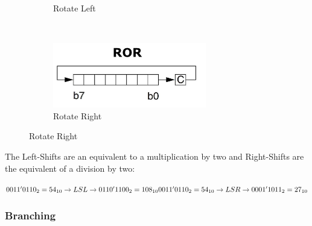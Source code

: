 \documentclass[a4paper, 11pt, nofootinbib]{book}
\begin{document}
\begin{figure}[htb]
\begin{subfigure}[b]{0.5\textwidth}
		\caption{Rotate Left}
	\end{subfigure}%
	~ 
	\begin{subfigure}[b]{0.5\textwidth}
		\centering
		\includegraphics[keepaspectratio=true, height=7.5\baselineskip]{ROR.PNG}
		\caption{Rotate Right}
	\end{subfigure}
\end{figure}

\noindent The Left-Shifts are an equivalent to a multiplication by two and Right-Shifts are the equivalent of a division by two:

\noindent 
$
0011'0110_{2} = 54_{10} \rightarrow LSL \rightarrow 0110'1100_{2} = 108_{10} \\
0011'0110_{2} = 54_{10} \rightarrow LSR \rightarrow 0001'1011_{2} = 27_{10}
$

\subsubsection{Branching}
\end{document}
